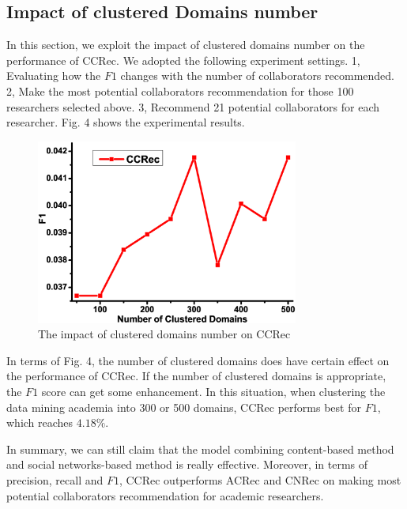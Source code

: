 \documentclass[review]{elsarticle}
\begin{document}
\subsection{Impact of clustered Domains number}
In this section, we exploit the impact of clustered domains number on the performance of CCRec. We adopted the following experiment settings. 1, Evaluating how the $F1$ changes with the number of collaborators recommended. 2, Make the most potential collaborators recommendation for those 100 researchers selected above. 3, Recommend 21 potential collaborators for each researcher. Fig. 4 shows the experimental results.

\begin{figure}
\centering
\includegraphics [width=3.4in]{Fig4.eps}
\caption{The impact of clustered domains number on CCRec}
\end{figure}

In terms of Fig. 4, the number of clustered domains does have certain effect on the performance of CCRec. If the number of clustered domains is appropriate, the $F1$ score can get some enhancement. In this situation, when clustering the data mining academia into 300 or 500 domains, CCRec performs best for $F1$, which reaches $4.18\%$.

In summary, we can still claim that the model combining content-based method and social networks-based method is really effective. Moreover, in terms of precision, recall and $F1$, CCRec outperforms ACRec and CNRec on making most potential collaborators recommendation for academic researchers.
\end{document}

